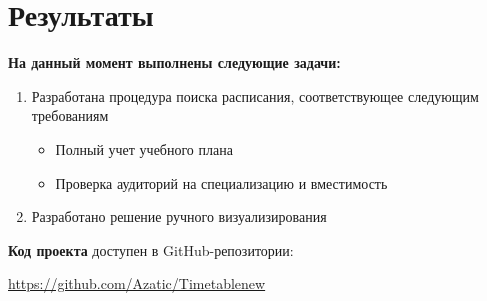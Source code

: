 \section{Результаты}
\textbf{На данный момент выполнены следующие задачи:}
\begin{enumerate}
    \item Разработана процедура поиска расписания, соответствующее следующим требованиям
    \begin{itemize}
        \item Полный учет учебного плана
        \item Проверка аудиторий на специализацию и вместимость
    \end{itemize}
    
    \item Разработано решение ручного визуализирования
\end{enumerate}

 \textbf{Код проекта} доступен в GitHub-репозитории: 
 
 \url{https://github.com/Azatic/Timetablenew}



% 

\setmonofont[Mapping=tex-text]{CMU Typewriter Text}
  
  

